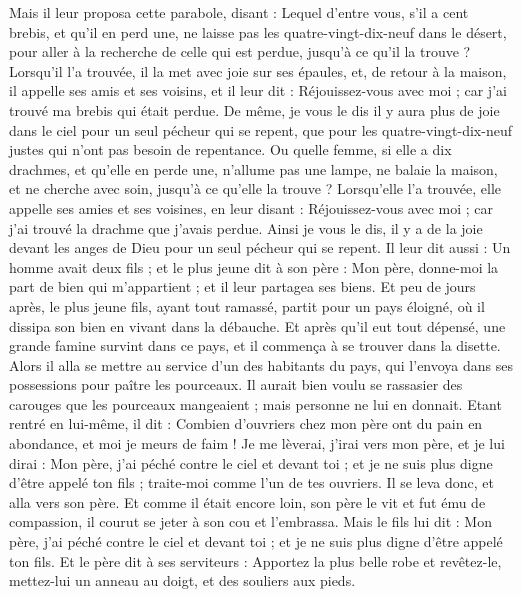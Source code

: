 \begin{multicols}{2}
Mais il leur proposa cette parabole, disant :
Lequel d'entre vous, s'il a cent brebis, et qu'il en perd une, ne laisse pas les quatre-vingt-dix-neuf dans le désert, pour aller à la recherche de celle qui est perdue, jusqu'à ce qu'il la trouve ?
Lorsqu'il l'a trouvée, il la met avec joie sur ses épaules,
et, de retour à la maison, il appelle ses amis et ses voisins, et il leur dit : Réjouissez-vous avec moi ; car j'ai trouvé ma brebis qui était perdue.
De même, je vous le dis il y aura plus de joie dans le ciel pour un seul pécheur qui se repent, que pour les quatre-vingt-dix-neuf justes qui n'ont pas besoin de repentance.
Ou quelle femme, si elle a dix drachmes, et qu'elle en perde une, n'allume pas une lampe, ne balaie la maison, et ne cherche avec soin, jusqu'à ce qu'elle la trouve ?
Lorsqu'elle l'a trouvée, elle appelle ses amies et ses voisines, en leur disant : Réjouissez-vous avec moi ; car j'ai trouvé la drachme que j'avais perdue.
Ainsi je vous le dis, il y a de la joie devant les anges de Dieu pour un seul pécheur qui se repent.
Il leur dit aussi : Un homme avait deux fils ;
et le plus jeune dit à son père : Mon père, donne-moi la part de bien qui m'appartient ; et il leur partagea ses biens.
Et peu de jours après, le plus jeune fils, ayant tout ramassé, partit pour un pays éloigné, où il dissipa son bien en vivant dans la débauche.
Et après qu'il eut tout dépensé, une grande famine survint dans ce pays, et il commença à se trouver dans la disette.
Alors il alla se mettre au service d'un des habitants du pays, qui l'envoya dans ses possessions pour paître les pourceaux.
Il aurait bien voulu se rassasier des carouges que les pourceaux mangeaient ; mais personne ne lui en donnait.
Etant rentré en lui-même, il dit : Combien d'ouvriers chez mon père ont du pain en abondance, et moi je meurs de faim !
Je me lèverai, j'irai vers mon père, et je lui dirai : Mon père, j'ai péché contre le ciel et devant toi ;
et je ne suis plus digne d'être appelé ton fils ; traite-moi comme l'un de tes ouvriers.
Il se leva donc, et alla vers son père. Et comme il était encore loin, son père le vit et fut ému de compassion, il courut se jeter à son cou et l'embrassa.
Mais le fils lui dit : Mon père, j'ai péché contre le ciel et devant toi ; et je ne suis plus digne d'être appelé ton fils.
Et le père dit à ses serviteurs : Apportez la plus belle robe et revêtez-le, mettez-lui un anneau au doigt, et des souliers aux pieds.

\end{multicols}
